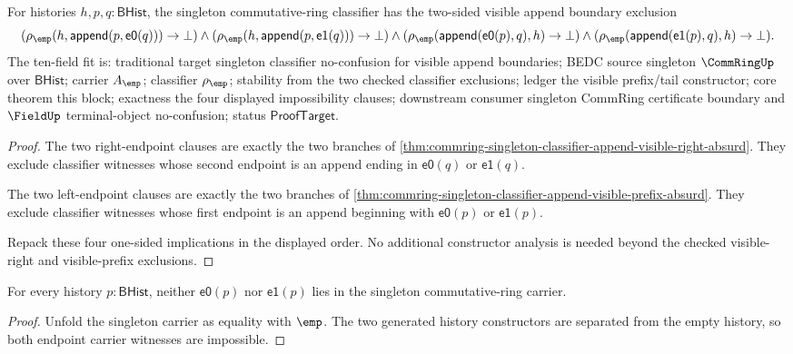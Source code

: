 \begin{theorem}
\label{thm:commring-singleton-classifier-visible-boundary-package}
For histories $h,p,q:\mathsf{BHist}$, the singleton commutative-ring classifier
has the two-sided visible append boundary exclusion
$$
(\rho_{\emp}(h,\mathsf{append}(p,\mathsf{e0}(q)))\to\bot)
\land
(\rho_{\emp}(h,\mathsf{append}(p,\mathsf{e1}(q)))\to\bot)
\land
(\rho_{\emp}(\mathsf{append}(\mathsf{e0}(p),q),h)\to\bot)
\land
(\rho_{\emp}(\mathsf{append}(\mathsf{e1}(p),q),h)\to\bot).
$$
The ten-field fit is: traditional target singleton classifier no-confusion for
visible append boundaries; BEDC source singleton $\CommRingUp$ over
$\mathsf{BHist}$; carrier $A_{\emp}$; classifier $\rho_{\emp}$; stability from
the two checked classifier exclusions; ledger the visible prefix/tail
constructor; core theorem this block; exactness the four displayed
impossibility clauses; downstream consumer singleton CommRing certificate
boundary and $\FieldUp$ terminal-object no-confusion; status
$\mathsf{ProofTarget}$.
\end{theorem}
\begin{proof}
The two right-endpoint clauses are exactly the two branches of
\autoref{thm:commring-singleton-classifier-append-visible-right-absurd}. They
exclude classifier witnesses whose second endpoint is an append ending in
$\mathsf{e0}(q)$ or $\mathsf{e1}(q)$.

The two left-endpoint clauses are exactly the two branches of
\autoref{thm:commring-singleton-classifier-append-visible-prefix-absurd}. They
exclude classifier witnesses whose first endpoint is an append beginning with
$\mathsf{e0}(p)$ or $\mathsf{e1}(p)$.

Repack these four one-sided implications in the displayed order. No additional
constructor analysis is needed beyond the checked visible-right and
visible-prefix exclusions.
\end{proof}

\begin{theorem}
\label{thm:commring-singleton-carrier-visible-absurd}
For every history $p:\mathsf{BHist}$, neither $\mathsf{e0}(p)$ nor
$\mathsf{e1}(p)$ lies in the singleton commutative-ring carrier.
\end{theorem}
\begin{proof}
Unfold the singleton carrier as equality with $\emp$. The two generated
history constructors are separated from the empty history, so both endpoint
carrier witnesses are impossible.
\end{proof}

